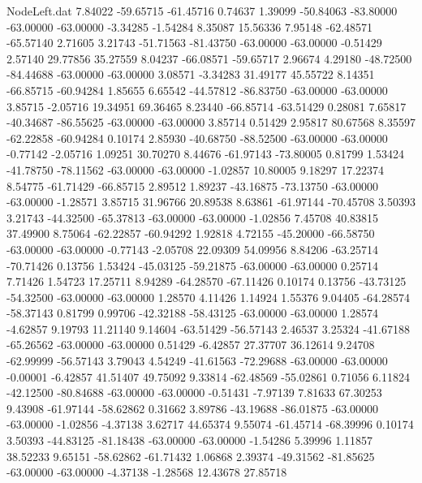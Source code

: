 \begin{filecontents}{NodeLeft.dat}
   7.84022  -59.65715  -61.45716     0.74637    1.39099  -50.84063  -83.80000  -63.00000  -63.00000   -3.34285   -1.54284    8.35087   15.56336
   7.95148  -62.48571  -65.57140     2.71605    3.21743  -51.71563  -81.43750  -63.00000  -63.00000   -0.51429    2.57140   29.77856   35.27559
   8.04237  -66.08571  -59.65717     2.96674    4.29180  -48.72500  -84.44688  -63.00000  -63.00000    3.08571   -3.34283   31.49177   45.55722
   8.14351  -66.85715  -60.94284     1.85655    6.65542  -44.57812  -86.83750  -63.00000  -63.00000    3.85715   -2.05716   19.34951   69.36465
   8.23440  -66.85714  -63.51429     0.28081    7.65817  -40.34687  -86.55625  -63.00000  -63.00000    3.85714    0.51429    2.95817   80.67568
   8.35597  -62.22858  -60.94284     0.10174    2.85930  -40.68750  -88.52500  -63.00000  -63.00000   -0.77142   -2.05716    1.09251   30.70270
   8.44676  -61.97143  -73.80005     0.81799    1.53424  -41.78750  -78.11562  -63.00000  -63.00000   -1.02857   10.80005    9.18297   17.22374
   8.54775  -61.71429  -66.85715     2.89512    1.89237  -43.16875  -73.13750  -63.00000  -63.00000   -1.28571    3.85715   31.96766   20.89538
   8.63861  -61.97144  -70.45708     3.50393    3.21743  -44.32500  -65.37813  -63.00000  -63.00000   -1.02856    7.45708   40.83815   37.49900
   8.75064  -62.22857  -60.94292     1.92818    4.72155  -45.20000  -66.58750  -63.00000  -63.00000   -0.77143   -2.05708   22.09309   54.09956
   8.84206  -63.25714  -70.71426     0.13756    1.53424  -45.03125  -59.21875  -63.00000  -63.00000    0.25714    7.71426    1.54723   17.25711
   8.94289  -64.28570  -67.11426     0.10174    0.13756  -43.73125  -54.32500  -63.00000  -63.00000    1.28570    4.11426    1.14924    1.55376
   9.04405  -64.28574  -58.37143     0.81799    0.99706  -42.32188  -58.43125  -63.00000  -63.00000    1.28574   -4.62857    9.19793   11.21140
   9.14604  -63.51429  -56.57143     2.46537    3.25324  -41.67188  -65.26562  -63.00000  -63.00000    0.51429   -6.42857   27.37707   36.12614
   9.24708  -62.99999  -56.57143     3.79043    4.54249  -41.61563  -72.29688  -63.00000  -63.00000   -0.00001   -6.42857   41.51407   49.75092
   9.33814  -62.48569  -55.02861     0.71056    6.11824  -42.12500  -80.84688  -63.00000  -63.00000   -0.51431   -7.97139    7.81633   67.30253
   9.43908  -61.97144  -58.62862     0.31662    3.89786  -43.19688  -86.01875  -63.00000  -63.00000   -1.02856   -4.37138    3.62717   44.65374
   9.55074  -61.45714  -68.39996     0.10174    3.50393  -44.83125  -81.18438  -63.00000  -63.00000   -1.54286    5.39996    1.11857   38.52233
   9.65151  -58.62862  -61.71432     1.06868    2.39374  -49.31562  -81.85625  -63.00000  -63.00000   -4.37138   -1.28568   12.43678   27.85718

\end{filecontents}
